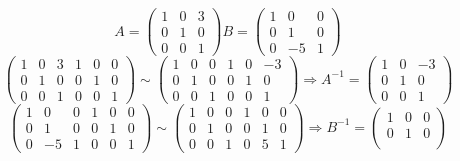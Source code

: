 \documentclass[12pt]{article}
\begin{document}
\begin{sloppypar}
    \[
        A = \begin{pmatrix}
            1 & 0 & 3 \\
            0 & 1 & 0 \\
            0 & 0 & 1
        \end{pmatrix}
        B = \begin{pmatrix}
            1 & 0  & 0 \\
            0 & 1  & 0 \\
            0 & -5 & 1
        \end{pmatrix}
    \]
    \[
        \left(
        \begin{array}{ccc|ccc}
                1 & 0 & 3 & 1 & 0 & 0 \\
                0 & 1 & 0 & 0 & 1 & 0 \\
                0 & 0 & 1 & 0 & 0 & 1
            \end{array}
        \right)
        \sim
        \left(
        \begin{array}{ccc|ccc}
                1 & 0 & 0 & 1 & 0 & -3 \\
                0 & 1 & 0 & 0 & 1 & 0  \\
                0 & 0 & 1 & 0 & 0 & 1
            \end{array}
        \right)
        \Rightarrow
        A^{-1} = \begin{pmatrix}
            1 & 0 & -3 \\
            0 & 1 & 0  \\
            0 & 0 & 1
        \end{pmatrix}
    \]
    \[
        \left(
        \begin{array}{ccc|ccc}
                1 & 0  & 0 & 1 & 0 & 0 \\
                0 & 1  & 0 & 0 & 1 & 0 \\
                0 & -5 & 1 & 0 & 0 & 1
            \end{array}
        \right)
        \sim
        \left(
        \begin{array}{ccc|ccc}
                1 & 0 & 0 & 1 & 0 & 0 \\
                0 & 1 & 0 & 0 & 1 & 0 \\
                0 & 0 & 1 & 0 & 5 & 1
            \end{array}
        \right)
        \Rightarrow
        B^{-1} = \begin{pmatrix}
            1 & 0 & 0 \\
            0 & 1 & 0 \\

\end{pmatrix}\]
\end{sloppypar}
\end{document}

